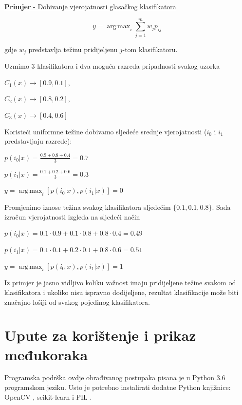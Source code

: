\documentclass[times, utf8, zavrsni, numeric]{fer}
\DeclareMathOperator*{\argmax}{arg\,max}
\begin{document}
\newpage

\underline{\textbf{Primjer} - Dobivanje vjerojatnosti glasačkog klasifikatora}

\[y = \argmax_i \sum_{j=1}^mw_jp_{ij}\]

gdje \(w_j\) predstavlja težinu pridijeljenu \(j\)-tom klasifikatoru.

\bigbreak

Uzmimo 3 klasifikatora i dva moguća razreda pripadnosti svakog uzorka 

\begin{center}
\(C_1(x) \rightarrow [0.9,0.1]\),
\end{center}
\begin{center}
\(C_2(x) \rightarrow [0.8,0.2]\),
\end{center}
\begin{center}
\(C_3(x) \rightarrow [0.4,0.6]\)
\end{center}

Koristeći uniformne težine dobivamo sljedeće srednje vjerojatnosti (\(i_0\) i \(i_1\) predstavljaju razrede):
\begin{center}
\(p(i_0|x)=\frac{0.9+0.8+0.4}{3}=0.7\)

\(p(i_1|x)=\frac{0.1+0.2+0.6}{3}=0.3\)

\(y=\argmax_i [p(i_0|x),p(i_1|x)]=0\)
\end{center}

Promjenimo iznose težina svakog klasifikatora sljedećim \(\{0.1,0.1,0.8\}\). Sada izračun
vjerojatnosti izgleda na sljedeći način

\begin{center}
\(p(i_0|x) = 0.1 \cdot 0.9 + 0.1 \cdot 0.8 + 0.8 \cdot 0.4 = 0.49\)

\(p(i_1|x) = 0.1 \cdot 0.1 + 0.2 \cdot 0.1 + 0.8 \cdot 0.6 = 0.51\)

\(y=\argmax_i [p(i_0|x),p(i_1|x)]=1\)
\end{center}

Iz primjer je jasno vidljivo koliku važnost imaju pridijeljene težine svakom od
klasifikatora i ukoliko nisu ispravno dodijeljene, rezultat klasifikacije može
biti značajno lošiji od svakog pojedinog klasifikatora.



\chapter{Upute za korištenje i prikaz međukoraka}

Programska podrška ovdje obrađivanog postupaka pisana je u Python 3.6 
programskom jeziku. Usto je potrebno instalirati dodatne Python 
knjižnice: OpenCV \citep{opencv.org}, scikit-learn \citep{scikit} i PIL \citep{pil}.
\end{document}
